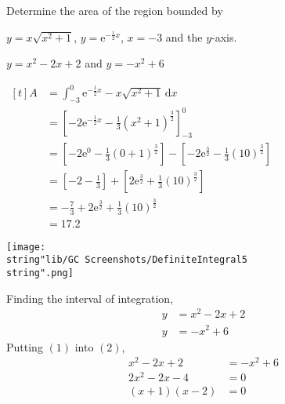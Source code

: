 \documentclass[11pt,a4paper]{book}
\begin{document}
\begin{example}

Determine the area of the region bounded by

\begin{tasks}[label=(\alph*),label-width=3.5ex,after-item-skip=2mm]

\task $y=x\sqrt{x^{2}+1}$, $y=\mathrm{e}^{-\frac{1}{2}x}$, $x=-3$ and the
$y$-axis.

\task $y=x^{2}-2x+2$ and $y=-x^{2}+6$

\end{tasks}

\Solution

\begin{tasks}[label=(\alph*),label-width=3.5ex]

\task
\begin{minipage}[t]{0.5\textwidth}
$
\begin{aligned}[t]
A & =\int_{-3}^{0}\mathrm{e}^{-\frac{1}{2}x}-x\sqrt{x^{2}+1}\,\mathrm{d}x\\
 & =\left[-2\mathrm{e}^{-\frac{1}{2}x}-\frac{1}{3}(x^{2}+1)^{\frac{3}{2}}\right]_{-3}^{0}\\
 & =\left[-2\mathrm{e}^{0}-\frac{1}{3}(0+1)^{\frac{3}{2}}\right]-\left[-2\mathrm{e}^{\frac{3}{2}}-\frac{1}{3}(10)^{\frac{3}{2}}\right]\\
 & =\left[-2-\frac{1}{3}\right]+\left[2\mathrm{e}^{\frac{3}{2}}+\frac{1}{3}(10)^{\frac{3}{2}}\right]\\
 & =-\frac{7}{3}+2\mathrm{e}^{\frac{3}{2}}+\frac{1}{3}(10)^{\frac{3}{2}}\\
 & =17.2
\end{aligned}
$
\end{minipage}
\begin{minipage}[t]{0.5\textwidth}
\begin{center}
\texttt{[image: \\string"lib/GC Screenshots/DefiniteIntegral5\\string".png]}
\par\end{center}
\end{minipage}

\task 
\begin{minipage}[t]{0.5\textwidth}
 Finding the interval of integration,
\begin{align*}
y & =x^{2}-2x+2\tag{1}\\
y & =-x^{2}+6\tag{2}
\end{align*}
Putting $(1)$ into $(2)$,
\begin{align*}
x^{2}-2x+2 & =-x^{2}+6\\
2x^{2}-2x-4 & =0\\
(x+1)(x-2) & =0
\end{align*}


\end{minipage}
\end{tasks}
\end{example}
\end{document}
